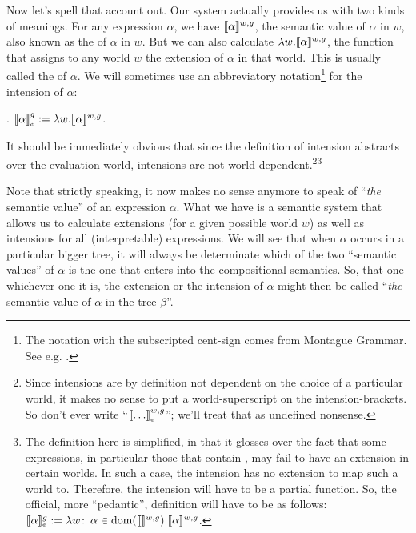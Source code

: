 Now %
%
let's spell that account out. Our system actually provides us with two kinds of
meanings. For any expression $\alpha$, we have $\llbracket \alpha \rrbracket^{w,g}$, the semantic
value of $\alpha$ in $w$, also known as the  of $\alpha$ in $w$.
But we can also calculate $\lambda w. \llbracket \alpha \rrbracket^{w,g}$, the function that
assigns to any world $w$ the extension of $\alpha$ in that world. This is
usually called the  of $\alpha$. We will sometimes use an
abbreviatory notation\footnote{The notation with the subscripted cent-sign comes
  from Montague Grammar. See e.g. \citet[147]{dowty-wall-peters:1981:intro}.}
for the intension of $\alpha$:

\ex. $\svcent{\alpha}^g := \lambda w. \sv{\alpha}^{w,g}$.

It should be immediately obvious that since the definition of intension
abstracts over the evaluation world, intensions are not
world-dependent.\footnote{Since intensions are by definition not dependent on
  the choice of a particular world, it makes no sense to put a world-superscript
  on the intension-brackets. So don't ever write ``$\svcent{\dots}^{w,g}$'';
  we'll treat that as undefined nonsense.}\footnote{The definition here is
  simplified, in that it glosses over the fact that some expressions, in
  particular those that contain , may fail to have
  an extension in certain worlds. In such a case, the intension has no extension
  to map such a world to. Therefore, the intension will have to be a partial
  function. So, the official, more ``pedantic'', definition will have to be as
  follows: $\sv{\alpha}_{\tiny \mbox{\textcent}}^g := \lambda w\co \alpha \in
  \mbox{dom}(\sv{\null}^{w,g}). \sv{\alpha}^{w,g}$.}

Note that strictly speaking, it now makes no sense anymore to speak of
``\emph{the} semantic value'' of an expression $\alpha$. What we have is a
semantic system that allows us to calculate extensions (for a given possible
world $w$) as well as intensions for all (interpretable) expressions. We will
see that when $\alpha$ occurs in a particular bigger tree, it will always be
determinate which of the two ``semantic values'' of $\alpha$ is the one that
enters into the compositional semantics. So, that one \dash whichever one it is,
the extension or the intension of $\alpha$ \dash might then be called
``\emph{the} semantic value of $\alpha$ in the tree $\beta$''.

